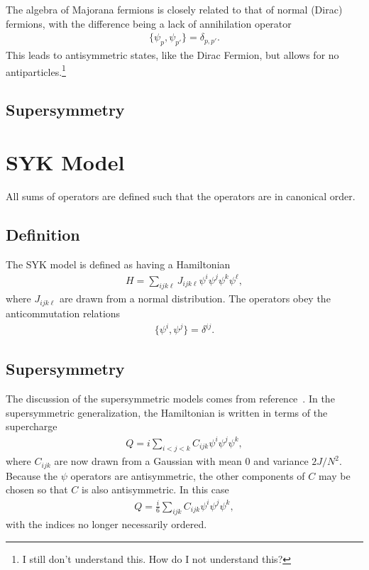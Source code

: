\documentclass[12pt]{article} %
\renewcommand{\l}{\ell}
\begin{document}
The algebra of Majorana fermions is closely related to that of normal (Dirac) fermions, with the difference being a lack of annihilation operator
\begin{align}
\{\psi_p,\psi_{p'}\} = \delta_{p,p'}.
\end{align}
This leads to antisymmetric states, like the Dirac Fermion, but allows for no antiparticles.\footnote{I still don't understand this. How do I not understand this?}

\subsection{Supersymmetry} \emph{}



\section{SYK Model}

All sums of operators are defined such that the operators are in canonical order.

\subsection{Definition} \emph{}

The SYK model is defined as having a Hamiltonian
\begin{align}
H = \sum_{ijk\l}J_{ijk\l}\psi^i\psi^j\psi^k\psi^\l,
\end{align}
where $J_{ijk\l}$ are drawn from a normal distribution. The operators obey the anticommutation relations
\begin{align}
\{\psi^i,\psi^j\} = \delta^{ij}.
\end{align}

\subsection{Supersymmetry}\emph{}

The discussion of the supersymmetric models comes from reference~\cite{fu16}. In the supersymmetric generalization, the Hamiltonian is written in terms of the supercharge
\begin{align}
Q = i\sum_{i<j<k}C_{ijk}\psi^i\psi^j\psi^k,
\end{align}
where $C_{ijk}$ are now drawn from a Gaussian with mean 0 and variance $2J/N^2$. Because the $\psi$ operators are antisymmetric, the other components of $C$ may be chosen so that $C$ is also antisymmetric. In this case 
\begin{align}
Q = \frac{i}{6}\sum_{ijk}C_{ijk}\psi^i\psi^j\psi^k,
\end{align}
with the indices no longer necessarily ordered.
\end{document}
